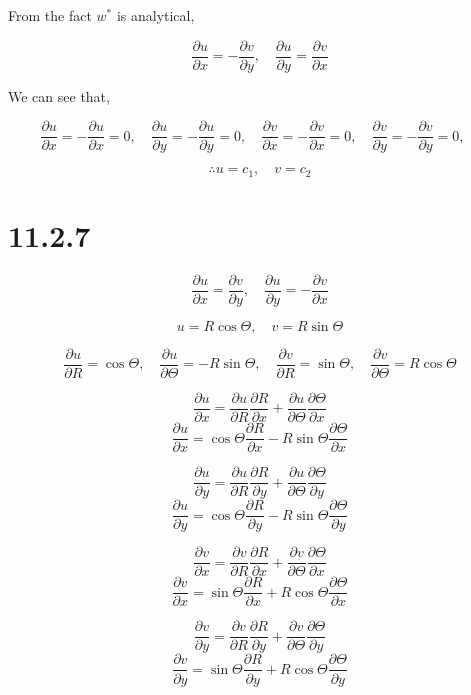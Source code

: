 \documentclass[12pt]{article}
\begin{document}
From the fact $w^*$ is analytical,

\[
    \frac{\partial u}{\partial x} = -\frac{\partial v}{\partial y},
    \quad \frac{\partial u}{\partial y} = \frac{\partial v}{\partial x}
\]

We can see that,

\[
    \frac{\partial u}{\partial x} = - \frac{\partial u}{\partial x} = 0,\quad
    \frac{\partial u}{\partial y} = - \frac{\partial u}{\partial y} = 0,\quad
    \frac{\partial v}{\partial x} = - \frac{\partial v}{\partial x} = 0,\quad
    \frac{\partial v}{\partial y} = - \frac{\partial v}{\partial y} = 0,\quad
\]

\[
    \therefore u = c_1,\quad v = c_2
\]

\newpage
\section{11.2.7}

\[
    \frac{\partial u}{\partial x} = \frac{\partial v}{\partial y},
    \quad \frac{\partial u}{\partial y} = -\frac{\partial v}{\partial x}
\]

\[
    u = R\cos{\Theta},\quad v = R\sin{\Theta}
\]

\[
    \frac{\partial u}{\partial R} = \cos{\Theta},\quad
    \frac{\partial u}{\partial \Theta} = -R\sin{\Theta},\quad
    \frac{\partial v}{\partial R} = \sin{\Theta},\quad
    \frac{\partial v}{\partial \Theta} = R\cos{\Theta}
\]

\[
    \frac{\partial u}{\partial x} = \frac{\partial u}{\partial R}\frac{\partial R}{\partial x} + \frac{\partial u}{\partial \Theta}\frac{\partial \Theta}{\partial x}
\]
\[
    \frac{\partial u}{\partial x} = \cos{\Theta}\frac{\partial R}{\partial x} - R\sin{\Theta}\frac{\partial \Theta}{\partial x}
\]

\[
    \frac{\partial u}{\partial y} = \frac{\partial u}{\partial R}\frac{\partial R}{\partial y} + \frac{\partial u}{\partial \Theta}\frac{\partial \Theta}{\partial y}
\]
\[
    \frac{\partial u}{\partial y} = \cos{\Theta}\frac{\partial R}{\partial y} - R\sin{\Theta}\frac{\partial \Theta}{\partial y}
\]

\[
    \frac{\partial v}{\partial x} = \frac{\partial v}{\partial R}\frac{\partial R}{\partial x} + \frac{\partial v}{\partial \Theta}\frac{\partial \Theta}{\partial x}
\]
\[
    \frac{\partial v}{\partial x} = \sin{\Theta}\frac{\partial R}{\partial x} + R\cos{\Theta}\frac{\partial \Theta}{\partial x}
\]

\[
    \frac{\partial v}{\partial y} = \frac{\partial v}{\partial R}\frac{\partial R}{\partial y} + \frac{\partial v}{\partial \Theta}\frac{\partial \Theta}{\partial y}
\]
\[
    \frac{\partial v}{\partial y} = \sin{\Theta}\frac{\partial R}{\partial y} + R\cos{\Theta}\frac{\partial \Theta}{\partial y}
\]
\end{document}
